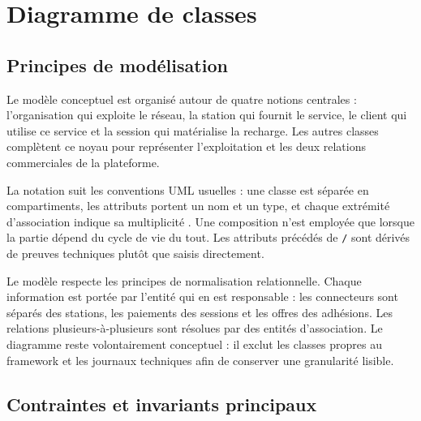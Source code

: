\section{Diagramme de classes}

\subsection{Principes de modélisation}

Le modèle conceptuel est organisé autour de quatre notions centrales :
l'organisation qui exploite le réseau, la station qui fournit le service, le
client qui utilise ce service et la session qui matérialise la recharge. Les
autres classes complètent ce noyau pour représenter l'exploitation et les deux
relations commerciales de la plateforme.

La notation suit les conventions UML usuelles : une classe est séparée en
compartiments, les attributs portent un nom et un type, et chaque extrémité
d'association indique sa multiplicité \cite{audibertUmlClasses}. Une composition
n'est employée que lorsque la partie dépend du cycle de vie du tout. Les
attributs précédés de \texttt{/} sont dérivés de preuves techniques plutôt que
saisis directement.

Le modèle respecte les principes de normalisation relationnelle. Chaque
information est portée par l'entité qui en est responsable : les connecteurs sont
séparés des stations, les paiements des sessions et les offres des adhésions. Les
relations plusieurs-à-plusieurs sont résolues par des entités d'association. Le
diagramme reste volontairement conceptuel : il exclut les classes propres au
framework et les journaux techniques afin de conserver une granularité lisible.

\subsection{Contraintes et invariants principaux}

